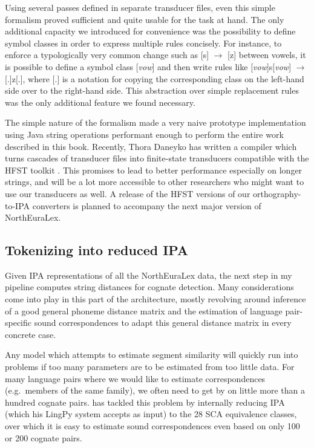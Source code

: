 Using several passes defined in separate transducer files, even this simple formalism proved sufficient and quite usable for the task at hand. The only additional capacity we introduced for convenience was the possibility to define symbol classes in order to express multiple rules concisely. For instance, to enforce a typologically very common change such as [s] $\rightarrow$ [z] between vowels, it is possible to define a symbol class [\textit{vow}] and then write rules like [\textit{vow}]s[\textit{vow}] $\rightarrow$ [.]z[.], where [.] is a notation for copying the corresponding class on the left-hand side over to the right-hand side. This abstraction over simple replacement rules was the only additional feature we found necessary.

The simple nature of the formalism made a very naive prototype implementation using Java string operations performant enough to perform the entire work described in this book. Recently, Thora Daneyko has written a compiler which turns cascades of transducer files into finite-state transducers compatible with the HFST toolkit \citep{linden_ea_2011}. This promises to lead to better performance especially on longer strings, and will be a lot more accessible to other researchers who might want to use our transducers as well. A release of the HFST versions of our orthography-to-IPA converters is planned to accompany the next major version of NorthEuraLex.

\subsection{Tokenizing into reduced IPA}
Given IPA representations of all the NorthEuraLex data, the next step in my pipeline computes string distances for cognate detection. Many considerations come into play in this part of the architecture, mostly revolving around inference of a good general phoneme distance matrix and the estimation of language pair-specific sound correspondences to adapt this general distance matrix in every concrete case.

Any model which attempts to estimate segment similarity will quickly run into problems if too many parameters are to be estimated from too little data. For many language pairs where we would like to estimate correspondences (e.g.\ members of the same family), we often need to get by on little more than a hundred cognate pairs. \cite{list2012} has tackled this problem by internally reducing IPA (which his LingPy system accepts as input) to the 28 SCA equivalence classes, over which it is easy to estimate sound correspondences even based on only 100 or 200 cognate pairs.

